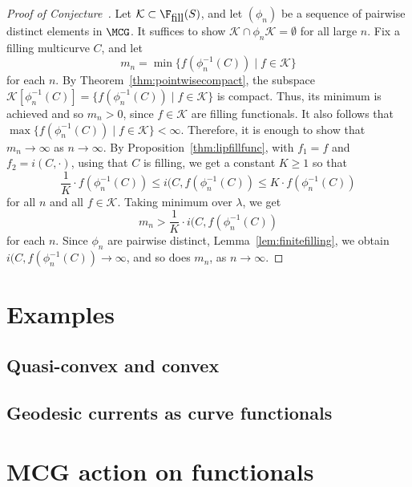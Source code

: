 \begin{proof}[Proof of Conjecture~\label{conj:propdisc}]
Let $\mathcal{K} \subset \F_{\mbox{fill}}(S)$, and let $(\phi_n)$ be a sequence of pairwise distinct elements in $\MCG$.
It suffices to show $\mathcal{K} \cap \phi_n\mathcal{K} = \emptyset$ for all large $n$.
Fix a filling multicurve $C$, and let
\[
m_n = \min \{ f(\phi_n^{-1}(C)) \mid f \in \mathcal{K} \}
\]
for each $n$.
By Theorem~\ref{thm:pointwisecompact}, the subspace $\mathcal{K}[\phi_n^{-1}(C)]=\{ f(\phi_n^{-1}(C)) \mid f \in \mathcal{K} \}$ is compact. Thus, its minimum is achieved and so $m_n >0$, since $f \in \mathcal{K}$ are filling functionals.
It also follows that $\max \{ f(\phi_n^{-1}(C)) \mid f \in \mathcal{K} \} < \infty$.
Therefore, it is enough to show that $m_n \to \infty$ as $n \to \infty$.
By  Proposition~\ref{thm:lipfillfunc}, with $f_1=f$ and $f_2=i(C,\cdot)$, using that $C$ is filling, we get a constant $K \geq 1$ so that
\[
  \frac{1}{K}\cdot f(\phi_n^{-1}(C)) \leq i(C,f(\phi_n^{-1}(C)) \leq K\cdot f(\phi_n^{-1}(C)) 
\]
for all $n$ and all $f \in \mathcal{K}$. Taking minimum over $\lambda$, we get
\[
  m_n > \frac{1}{K} \cdot i(C,f(\phi_n^{-1}(C))
\]
for each $n$. Since $\phi_n$ are pairwise distinct, Lemma~\ref{lem:finitefilling}, we obtain $i(C,f(\phi_n^{-1}(C)) \to \infty$, and so does $m_n$, as $n \to \infty$.
\end{proof}


\section{Examples}

\subsection{Quasi-convex and convex}

\subsection{Geodesic currents as curve functionals}

\section{MCG action on functionals}

